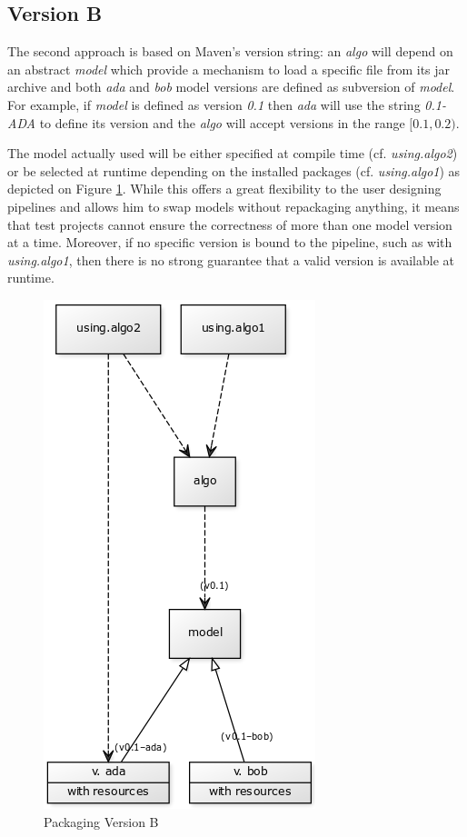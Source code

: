 \documentclass{article}
\newcommand{\id}[1]{\mbox{\textit{#1}}}
\begin{document}
\subsection{Version B}

The second approach is based on Maven's version string: an \id{algo} will depend on an abstract \id{model} which provide a mechanism to load a specific file from its jar archive and both \id{ada} and \id{bob} model versions are defined as subversion of \id{model}. For example, if \id{model} is defined as version \id{0.1} then \id{ada} will use the string \id{0.1-ADA} to define its version and the \id{algo} will accept versions in the range $ [0.1,0.2) $.

The model actually used will be either specified at compile time (cf. \id{using.algo2}) or be selected at runtime depending on the installed packages (cf. \id{using.algo1}) as depicted on Figure \ref{fig:pkgsysB}. While this offers a great flexibility to the user designing pipelines and allows him to swap models without repackaging anything, it means that test projects cannot ensure the correctness of more than one model version at a time. Moreover, if no specific version is bound to the pipeline, such as with \id{using.algo1}, then there is no strong guarantee that a valid version is available at runtime.

\begin{figure}
\centering
\includegraphics{res/packaging_version_B.png}
\caption{Packaging Version B}
\label{fig:pkgsysB}
\end{figure}
\end{document}
